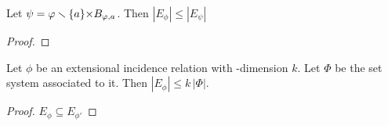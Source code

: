 \documentclass[sputnik.tex]{subfiles}
\begin{document}
\begin{proposition}\label{prop_shattered} 
Let $\psi=\varphi\smallsetminus\{a\}{\times}B_{\varphi,a}$. Then $|E_\phi|\le |E_{\psi}|$
\end{proposition}

\begin{proof}

\end{proof}



\begin{proposition}
Let $\phi$ be an extensional incidence relation with \vc-dimension $k$. Let $\Phi$ be the set system associated to it. Then $|E_\phi|\le k\,|\Phi|$.
\end{proposition}

\begin{proof}
$E_\phi\subseteq E_{\phi'}$ 
\end{proof}
\end{document}
